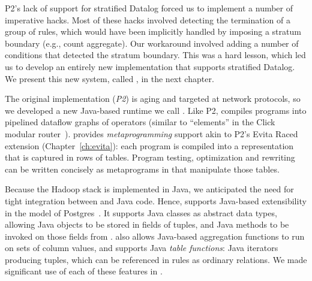 P2's lack of support for stratified Datalog forced us to implement 
a number of imperative hacks. Most of these hacks involved detecting
the termination of a group of rules, which would have been implicitly handled
by imposing a stratum boundary (e.g., count aggregate). Our workaround involved
adding a number of conditions that detected the stratum boundary. This
was a hard lesson, which led us to develop an entirely new \OVERLOG
implementation that supports stratified Datalog. We present this new
system, called \JOL, in the next chapter.

The original \OVERLOG implementation (\emph{P2}) is aging and targeted at network
protocols, so we developed a new Java-based \OVERLOG runtime we call \emph{\JOL.}
Like P2, \JOL compiles \OVERLOG programs into pipelined dataflow graphs of
operators (similar to ``elements'' in the Click modular router~\cite{click}).
\JOL provides \emph{metaprogramming} support akin to P2's Evita Raced
extension (Chapter~\ref{ch:evita}): each \OVERLOG program is compiled into a
representation that is captured in rows of tables.  Program testing,
optimization and rewriting can be written concisely as metaprograms in \OVERLOG
that manipulate those tables.

Because the Hadoop stack is implemented in Java, we anticipated the need for
tight integration between \OVERLOG and Java code. Hence, \JOL supports Java-based
extensibility in the model of Postgres~\cite{postgres}.  It supports Java
classes as abstract data types, allowing Java objects to be stored in fields of
tuples, and Java methods to be invoked on those fields from \OVERLOG.  \JOL also
allows Java-based aggregation functions to run on sets of column values, and
supports Java \emph{table functions}: Java iterators producing tuples, which can
be referenced in \OVERLOG rules as ordinary relations. We made significant use of
each of these features in \BOOMA.



